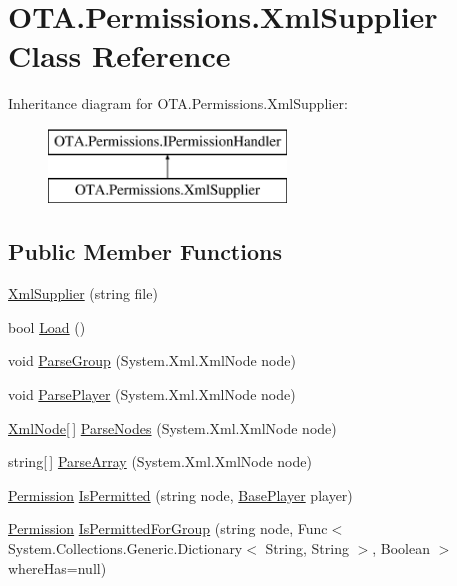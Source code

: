 \hypertarget{class_o_t_a_1_1_permissions_1_1_xml_supplier}{}\section{O\+T\+A.\+Permissions.\+Xml\+Supplier Class Reference}
\label{class_o_t_a_1_1_permissions_1_1_xml_supplier}
Inheritance diagram for O\+T\+A.\+Permissions.\+Xml\+Supplier\+:\begin{figure}[H]
\begin{center}
\leavevmode
\includegraphics[height=2.000000cm]{class_o_t_a_1_1_permissions_1_1_xml_supplier}
\end{center}
\end{figure}
\subsection*{Public Member Functions}
\begin{DoxyCompactItemize}
\item 
\hyperlink{class_o_t_a_1_1_permissions_1_1_xml_supplier_a36d4a5197251feb6fbf7bcb7851d0bc0}{Xml\+Supplier} (string file)
\item 
bool \hyperlink{class_o_t_a_1_1_permissions_1_1_xml_supplier_a7a1d4aa1c73b53a32c421467ad3ebac9}{Load} ()
\item 
void \hyperlink{class_o_t_a_1_1_permissions_1_1_xml_supplier_a9d15b0e2c222f0fc837cba41584ea8eb}{Parse\+Group} (System.\+Xml.\+Xml\+Node node)
\item 
void \hyperlink{class_o_t_a_1_1_permissions_1_1_xml_supplier_aa7d3b7f317b871713d4db9db83bce6a9}{Parse\+Player} (System.\+Xml.\+Xml\+Node node)
\item 
\hyperlink{class_o_t_a_1_1_permissions_1_1_xml_node}{Xml\+Node}\mbox{[}$\,$\mbox{]} \hyperlink{class_o_t_a_1_1_permissions_1_1_xml_supplier_a400f8241a0a5e314ec41315e917d89dc}{Parse\+Nodes} (System.\+Xml.\+Xml\+Node node)
\item 
string\mbox{[}$\,$\mbox{]} \hyperlink{class_o_t_a_1_1_permissions_1_1_xml_supplier_a44c9d99d4ddb5edab2d8e86ad76e19c9}{Parse\+Array} (System.\+Xml.\+Xml\+Node node)
\item 
\hyperlink{namespace_o_t_a_1_1_permissions_a18c21ab0745d885bbcfdc768e07c31b6}{Permission} \hyperlink{class_o_t_a_1_1_permissions_1_1_xml_supplier_a641d4ecef4c7c2ee7f146057374ed3f1}{Is\+Permitted} (string node, \hyperlink{class_o_t_a_1_1_base_player}{Base\+Player} player)
\item 
\hyperlink{namespace_o_t_a_1_1_permissions_a18c21ab0745d885bbcfdc768e07c31b6}{Permission} \hyperlink{class_o_t_a_1_1_permissions_1_1_xml_supplier_a38706ab21a953108a94bee975fc4146d}{Is\+Permitted\+For\+Group} (string node, Func$<$ System.\+Collections.\+Generic.\+Dictionary$<$ String, String $>$, Boolean $>$ where\+Has=null)
\end{DoxyCompactItemize}


